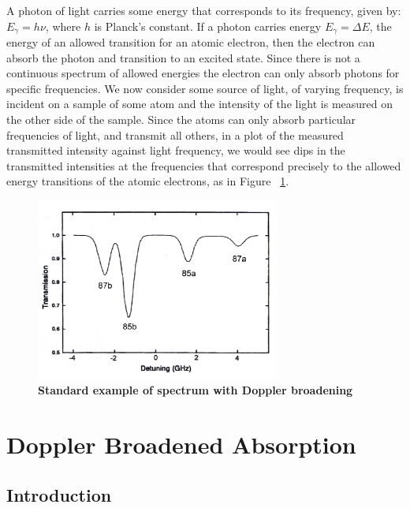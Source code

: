 \documentclass[paper=a4, fontsize=11pt]{scrartcl} %
\numberwithin{equation}{section}
\numberwithin{figure}{section}
\numberwithin{table}{section}
\begin{document}
A photon of light carries some energy that corresponds to its
frequency, given by: $E_\gamma = h\nu$, where $h$ is Planck's
constant. If a photon carries energy $E_\gamma = \Delta E$, the energy
of an allowed transition for an atomic electron, then the electron can
absorb the photon and transition to an excited state. Since there is
not a continuous spectrum of allowed energies the electron can only
absorb photons for specific frequencies. We now consider some source
of light, of varying frequency, is incident on a sample of some atom
and the intensity of the light is measured on the other side of the
sample. Since the atoms can only absorb particular frequencies of
light, and transmit all others, in a plot of the measured transmitted
intensity against light frequency, we would see dips in the
transmitted intensities at the frequencies that correspond precisely
to the allowed energy transitions of the atomic electrons, as in
Figure ~\ref{fig:broadening}. 

\begin{figure}[h] \begin{center}
  \includegraphics[height=60mm]{broadening.png}
  \caption{\textbf{Standard example of spectrum with Doppler broadening}\cite{caltech}}
  \label{fig:broadening}
\end{center} \end{figure}


\section{Doppler Broadened Absorption}
\label{sec:broad}

\subsection{Introduction}
\end{document}
